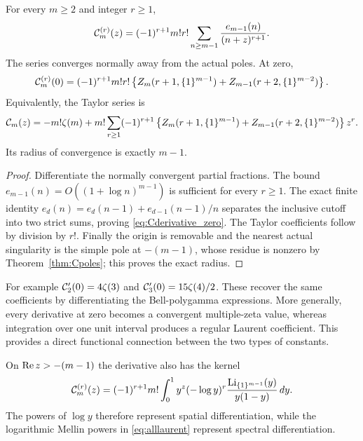 \begin{corollary}\label{cor:Cderivatives}
For every $m\ge2$ and integer $r\ge1$,
\begin{equation}\label{eq:Cderivatives}
 \mathcal C_m^{(r)}(z)=(-1)^{r+1}m!r!
       \sum_{n\ge m-1}\frac{e_{m-1}(n)}{(n+z)^{r+1}}.
\end{equation}
The series converges normally away from the actual poles. At zero,
\begin{equation}\label{eq:Cderivative_zero}
 \mathcal C_m^{(r)}(0)=(-1)^{r+1}m!r!
  \left\{Z_m(r+1,\{1\}^{m-1})
       +Z_{m-1}(r+2,\{1\}^{m-2})\right\}.
\end{equation}
Equivalently, the Taylor series is
\begin{equation}\label{eq:Ctaylor}
 \mathcal C_m(z)=-m!\zeta(m)
  +m!\sum_{r\ge1}(-1)^{r+1}
  \left\{Z_m(r+1,\{1\}^{m-1})
       +Z_{m-1}(r+2,\{1\}^{m-2})\right\}z^r.
\end{equation}
Its radius of convergence is exactly $m-1$.
\end{corollary}
\begin{proof}
Differentiate the normally convergent partial fractions. The bound
$e_{m-1}(n)=O((1+\log n)^{m-1})$ is sufficient for every
$r\ge1$. The exact finite identity
$e_d(n)=e_d(n-1)+e_{d-1}(n-1)/n$ separates the inclusive
cutoff into two strict sums, proving \eqref{eq:Cderivative_zero}.
The Taylor coefficients follow by division by $r!$. Finally the
origin is removable and the nearest actual singularity is the
simple pole at $-(m-1)$, whose residue is nonzero by
Theorem~\ref{thm:Cpoles}; this proves the exact radius.
\end{proof}

For example $\mathcal C_2'(0)=4\zeta(3)$ and
$\mathcal C_3'(0)=15\zeta(4)/2$. These recover the same coefficients
by differentiating the Bell-polygamma expressions. More generally,
every derivative at zero becomes a convergent multiple-zeta value,
whereas integration over one unit interval produces a regular
Laurent coefficient. This provides a direct functional connection
between the two types of constants.

On $\operatorname{Re} z>-(m-1)$ the derivative also has the kernel
\begin{equation}\label{eq:Cderivative_kernel}
 \mathcal C_m^{(r)}(z)=(-1)^{r+1}m!
  \int_0^1y^z(-\log y)^r
       \frac{\operatorname{Li}_{\{1\}^{m-1}}(y)}{y(1-y)}\,dy.
\end{equation}
The powers of $\log y$ therefore represent spatial differentiation,
while the logarithmic Mellin powers in \eqref{eq:alllaurent}
represent spectral differentiation.


